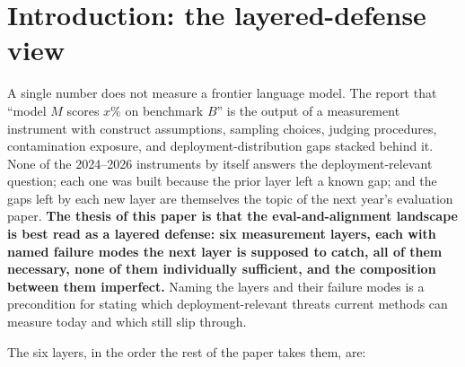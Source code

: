 
\section{Introduction: the layered-defense view}
\label{sec:introduction}

A single number does not measure a frontier language model. The
report that ``model $M$ scores $x\%$ on benchmark $B$'' is the
output of a measurement instrument with construct assumptions,
sampling choices, judging procedures, contamination exposure, and
deployment-distribution gaps stacked behind it. None of the
2024--2026 instruments by itself answers the deployment-relevant
question; each one was built because the prior layer left a known
gap; and the gaps left by each new layer are themselves the topic of
the next year's evaluation paper. \textbf{The thesis of this paper
is that the eval-and-alignment landscape is best read as a layered
defense: six measurement layers, each with named failure modes the
next layer is supposed to catch, all of them necessary, none of them
individually sufficient, and the composition between them
imperfect.} Naming the layers and their failure modes is a
precondition for stating which deployment-relevant
threats current methods can measure today and which still slip
through.

The six layers, in the order the rest of the paper takes them, are:

